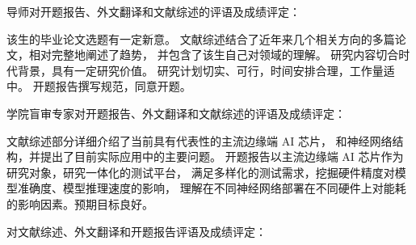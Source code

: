 \cleardoublepage

{
    \bfseries

    {
        \noindent 导师对开题报告、外文翻译和文献综述的评语及成绩评定：

        该生的毕业论文选题有一定新意。
        文献综述结合了近年来几个相关方向的多篇论文，相对完整地阐述了趋势，
        并包含了该生自己对领域的理解。
        研究内容切合时代背景，具有一定研究价值。
        研究计划切实、可行，时间安排合理，工作量适中。
        开题报告撰写规范，同意开题。
    }


    \thesisproposaleval[9][14][5]
    \signature{导师签名}

    {
        \noindent 学院盲审专家对开题报告、外文翻译和文献综述的评语及成绩评定：
        
        文献综述部分详细介绍了当前具有代表性的主流边缘端 AI 芯片，
        和神经网络结构，并提出了目前实际应用中的主要问题。
        开题报告以主流边缘端 AI 芯片作为研究对象，研究一体化的测试平台，
        满足多样化的测试需求，挖掘硬件精度对模型准确度、模型推理速度的影响，
        理解在不同神经网络部署在不同硬件上对能耗的影响因素。预期目标良好。
    }


    \mbox{} \vfill
    \thesisproposaleval[9][13][4]
    \signature{开题报告审核负责人（签名/签章）}
}
{
    \bfseries

    {
        \noindent 对文献综述、外文翻译和开题报告评语及成绩评定：
    }


    \mbox{} \vfill
    \thesisproposaleval
    \signature{开题报告答辩小组负责人（签名）}
}

